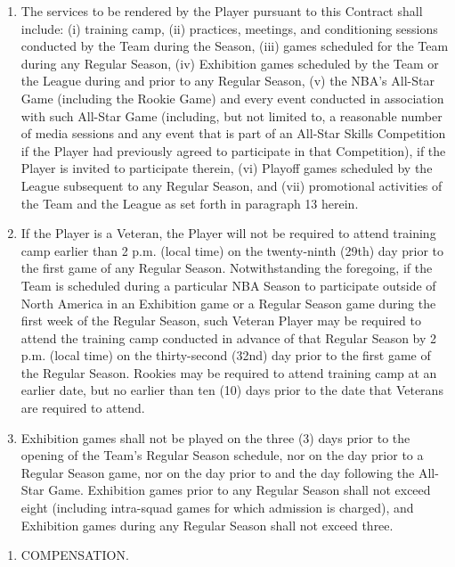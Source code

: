 \documentclass[
]{book}
\providecommand{\tightlist}{%
  \setlength{\itemsep}{0pt}\setlength{\parskip}{0pt}}
\begin{document}
\begin{enumerate}
\def\labelenumi{(\alph{enumi})}
\tightlist
\item
  The services to be rendered by the Player pursuant to this Contract shall include: (i) training camp, (ii) practices, meetings, and conditioning sessions conducted by the Team during the Season, (iii) games scheduled for the Team during any Regular Season, (iv) Exhibition games scheduled by the Team or the League during and prior to any Regular Season, (v) the NBA's All-Star Game (including the Rookie Game) and every event conducted in association with such All-Star Game (including, but not limited to, a reasonable number of media sessions and any event that is part of an All-Star Skills Competition if the Player had previously agreed to participate in that Competition), if the Player is invited to participate therein, (vi) Playoff games scheduled by the League subsequent to any Regular Season, and (vii) promotional activities of the Team and the League as set forth in paragraph 13 herein.
\item
  If the Player is a Veteran, the Player will not be required to attend training camp earlier than 2 p.m. (local time) on the twenty-ninth (29th) day prior to the first game of any Regular Season. Notwithstanding the foregoing, if the Team is scheduled during a particular NBA Season to participate outside of North America in an Exhibition game or a Regular Season game during the first week of the Regular Season, such Veteran Player may be required to attend the training camp conducted in advance of that Regular Season by 2 p.m. (local time) on the thirty-second (32nd) day prior to the first game of the Regular Season. Rookies may be required to attend training camp at an earlier date, but no earlier than ten (10) days prior to the date that Veterans are required to attend.
\item
  Exhibition games shall not be played on the three (3) days prior to the opening of the Team's Regular Season schedule, nor on the day prior to a Regular Season game, nor on the day prior to and the day following the All-Star Game. Exhibition games prior to any Regular Season shall not exceed eight (including intra-squad games for which admission is charged), and Exhibition games during any Regular Season shall not exceed three.
\end{enumerate}

\begin{enumerate}
\def\labelenumi{\arabic{enumi}.}
\setcounter{enumi}{2}
\tightlist
\item
  COMPENSATION.
\end{enumerate}
\end{document}
